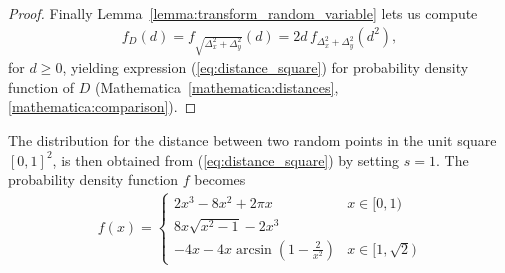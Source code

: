 \begin{proof}
  Finally Lemma~\ref{lemma:transform_random_variable} lets us compute
  \begin{align*}%
  f_D(d) = f_{\sqrt{\Delta_x^2 + \Delta_y^2}}(d) = 2d\, f_{\Delta_x^2 +
    \Delta_y^2}(d^2),
  \end{align*}
  for $d \geq 0$, yielding expression (\ref{eq:distance_square}) for
   probability density function of $D$
   (Mathematica~\ref{mathematica:distances}, \ref{mathematica:comparison}). 
\end{proof}

The distribution for the distance between two random points in the
unit square $[0,1]^2$, is then obtained from
(\ref{eq:distance_square}) by setting $s=1$. The probability
density function $f$ becomes
  \begin{align}\label{eq:distance_unit_square}
    f(x) = \begin{cases} 2 x^3 - 8 x^2 +  2 \pi x & x \in
      [0,1)\\ 8x \sqrt{x^2-1}-2x^3\\ -4x- 4x\arcsin\left(1-\frac{2}{x^2}\right)  & x \in [1,\sqrt{2})
           \end{cases}
  \end{align}
 
